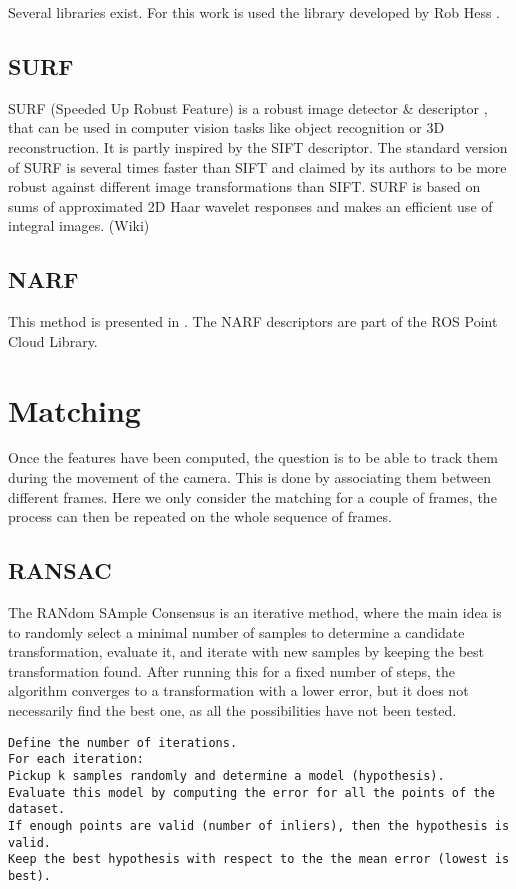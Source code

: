 Several libraries exist. For this work is used the library developed by Rob Hess \cite{hesssift}.

\subsection{SURF}
SURF (Speeded Up Robust Feature) is a robust image detector \& descriptor \cite{surf}, that can be used in computer vision tasks like object recognition or 3D reconstruction. It is partly inspired by the SIFT descriptor. The standard version of SURF is several times faster than SIFT and claimed by its authors to be more robust against different image transformations than SIFT. SURF is based on sums of approximated 2D Haar wavelet responses and makes an efficient use of integral images. (Wiki)

\subsection{NARF}
This method is presented in \cite{steder10irosws}. The NARF descriptors are part of the ROS Point Cloud Library.

\section{Matching}

Once the features have been computed, the question is to be able to track them during the movement of the camera. This is done by associating them between different frames. Here we only consider the matching for a couple of frames, the process can then be repeated on the whole sequence of frames.

\subsection{RANSAC}
The RANdom SAmple Consensus is an iterative method, where the main idea is to randomly select a minimal number of samples to determine a candidate transformation, evaluate it, and iterate with new samples by keeping the best transformation found. After running this for a fixed number of steps, the algorithm converges to a transformation with a lower error, but it does not necessarily find the best one, as all the possibilities have not been tested.

\begin{verbatim}
Define the number of iterations.
For each iteration:
Pickup k samples randomly and determine a model (hypothesis).
Evaluate this model by computing the error for all the points of the dataset.
If enough points are valid (number of inliers), then the hypothesis is valid.
Keep the best hypothesis with respect to the the mean error (lowest is best).
\end{verbatim}

